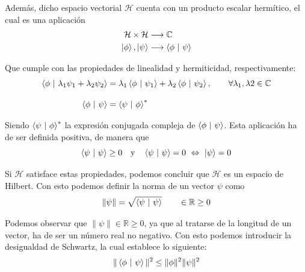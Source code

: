 \documentclass[12pt]{article}
\numberwithin{equation}{section} %
\begin{document}
    \vspace{1.5mm}

    Además, dicho espacio vectorial \( \mathcal{H} \) cuenta con un producto escalar hermítico, el cual es una aplicación
    \begin{align*}
        \mathcal{H} \times \mathcal{H} &\longrightarrow \mathbb{C} \\
        \ket{\phi}, \ket{\psi} &\longrightarrow \braket{\phi \ | \ \psi}
    \end{align*}

    \vspace{1.5mm}

    Que cumple con las propiedades de linealidad y hermiticidad, respectivamente:
    \begin{align*}
        \braket{\phi \ | \ \lambda_{1}\psi_{1} + \lambda_{2}\psi_{2}} &= \lambda_{1} \braket{\phi \ | \ \psi_{1}} + \lambda_{2} \braket{\phi \ | \ \psi_{2}}, \qquad \forall \lambda_{1}, \lambda{2} \in \mathbb{C} \\[10pt]
        \braket{\phi \ | \ \psi} &= \braket{\psi \ | \ \phi}^{*}
    \end{align*}

    \vspace{1.5mm}

    Siendo \( \braket{\psi \ | \ \phi}^{*} \) la expresión conjugada compleja de \( \braket{\phi \ | \ \psi} \). Esta aplicación ha de ser definida positiva, de manera que
    \begin{equation*}
        \braket{\psi \ | \ \psi} \geq 0 \quad \text{y} \quad \braket{\psi \ | \ \psi} = 0 \ \Leftrightarrow \ \ket{\psi} = 0
    \end{equation*}

    \vspace{1.5mm}

    Si \( \mathcal{H} \) satisface estas propiedades, podemos concluir que \( \mathcal{H} \) es un espacio de Hilbert. Con esto podemos definir la norma de un vector \( \psi \) como
    \begin{equation}
        \| \psi \| = \sqrt{\braket{\psi \ | \ \psi}} \qquad \in \mathbb{R} \geq 0
        \label{eq: norma_producto_escalar}
    \end{equation}

    \vspace{1.5mm}

    Podemos observar que \( \| \psi \| \in \mathbb{R} \geq 0 \), ya que al tratarse de la longitud de un vector, ha de ser un número real no negativo. Con esto podemos introducir la desigualdad de Schwartz, la cual establece lo siguiente:
    \begin{equation}
        \| \braket{\phi \ | \ \psi} \| ^{2} \leq \| \phi \| ^{2} \| \psi \|^{2}
        \label{eq: desigualdad_schwartz}
    \end{equation}
\end{document}
